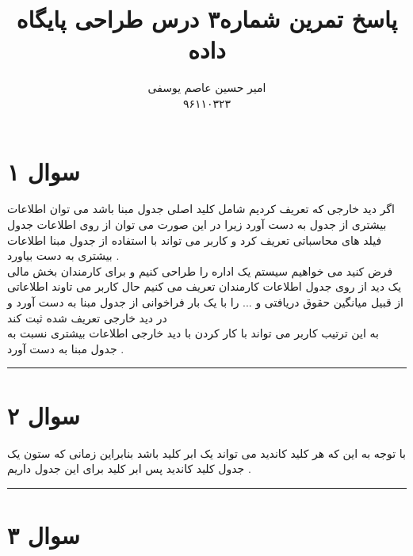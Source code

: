 \documentclass{article}
\title{پاسخ تمرین شماره۳ درس طراحی پایگاه داده }
\author{امیر حسین عاصم یوسفی \\ ۹۶۱۱۰۳۲۳}
\begin{document}
	\maketitle
	\section*{سوال ۱ } 
	
اگر دید خارجی که تعریف کردیم شامل کلید اصلی جدول مبنا باشد می توان اطلاعات بیشتری از جدول به دست آورد زیرا در این صورت می توان از روی اطلاعات جدول فیلد های محاسباتی تعریف کرد و کاربر می تواند با استفاده از جدول مبنا اطلاعات بیشتری به دست بیاورد . 
\\
فرض کنید می خواهیم سیستم یک اداره را طراحی کنیم و برای کارمندان بخش مالی یک دید از روی جدول اطلاعات کارمندان تعریف می کنیم حال  کاربر می تاوند اطلاعاتی از قبیل میانگین حقوق دریافتی و ... را  با یک بار فراخوانی از جدول مبنا به دست آورد و در دید خارجی تعریف شده ثبت کند 
\\
به این ترتیب کاربر  می تواند با کار کردن با دید خارجی اطلاعات بیشتری نسبت به جدول مبنا به دست آورد  . 
\hrule
\section*{سوال ۲}
با توجه به این که هر کلید کاندید می تواند یک ابر کلید باشد بنابراین زمانی که 
ستون یک جدول کلید کاندید پس 
\textcolor{red}{}
ابر کلید برای این جدول داریم   . 
\hrule
\section*{سوال ۳}
\end{document}
